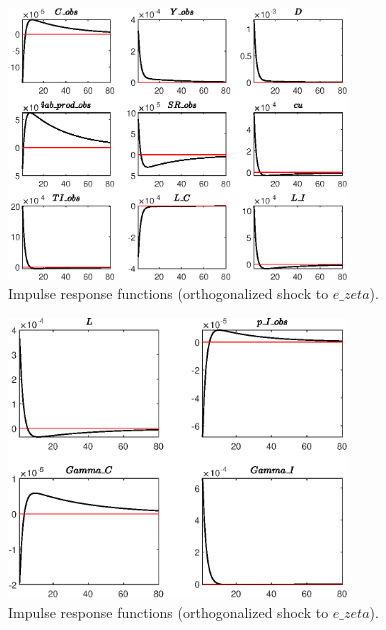 \begin{figure}[H]
\centering 
\includegraphics[width=0.80\textwidth]{directed_search/graphs/directed_search_IRF_e_zeta1}
\caption{Impulse response functions (orthogonalized shock to $e\_zeta$).}\label{Fig:IRF:e_zeta:1}
\end{figure}
 
\begin{figure}[H]
\centering 
\includegraphics[width=0.80\textwidth]{directed_search/graphs/directed_search_IRF_e_zeta2}
\caption{Impulse response functions (orthogonalized shock to $e\_zeta$).}\label{Fig:IRF:e_zeta:2}
\end{figure}
 
